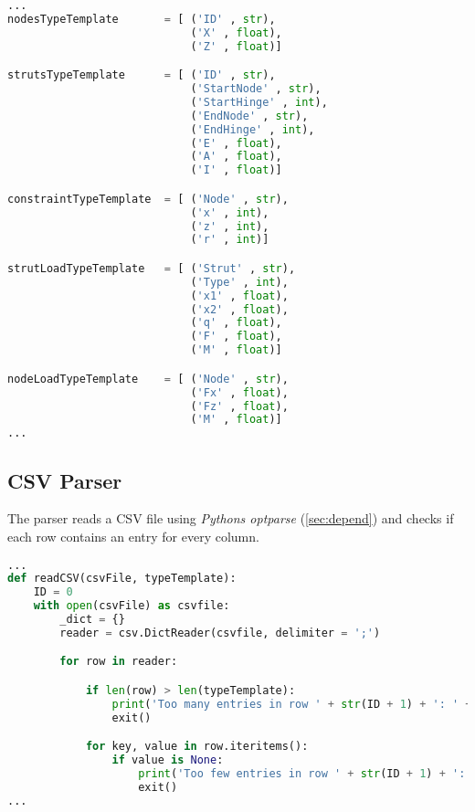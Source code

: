 \begin{inconsolata}
\begin{minipage}{\linewidth}
\begin{lstlisting}[language=python]
...
nodesTypeTemplate       = [ ('ID' , str),
                            ('X' , float),
                            ('Z' , float)]

strutsTypeTemplate      = [ ('ID' , str),
                            ('StartNode' , str),
                            ('StartHinge' , int),
                            ('EndNode' , str),
                            ('EndHinge' , int),
                            ('E' , float),
                            ('A' , float),
                            ('I' , float)]

constraintTypeTemplate  = [ ('Node' , str),
                            ('x' , int),
                            ('z' , int),
                            ('r' , int)]

strutLoadTypeTemplate   = [ ('Strut' , str),
                            ('Type' , int),
                            ('x1' , float),
                            ('x2' , float),
                            ('q' , float),
                            ('F' , float),
                            ('M' , float)]

nodeLoadTypeTemplate    = [ ('Node' , str),
                            ('Fx' , float),
                            ('Fz' , float),
                            ('M' , float)]
...
\end{lstlisting}
\end{minipage}
\end{inconsolata}

\subsection{CSV Parser}
\label{sec:csvparse}

The parser reads a CSV file using \textit{Pythons optparse} (\ref{sec:depend}) and checks if each row contains an entry for every column.

\begin{inconsolata}
\begin{minipage}{\linewidth}
\begin{lstlisting}[language=python]
...
def readCSV(csvFile, typeTemplate):
    ID = 0
    with open(csvFile) as csvfile:
        _dict = {}
        reader = csv.DictReader(csvfile, delimiter = ';')

        for row in reader:

            if len(row) > len(typeTemplate):
                print('Too many entries in row ' + str(ID + 1) + ': ' + csvFile)
                exit()

            for key, value in row.iteritems():
                if value is None:
                    print('Too few entries in row ' + str(ID + 1) + ': ' + csvFile)
                    exit()
...
\end{lstlisting}
\end{minipage}
\end{inconsolata}

